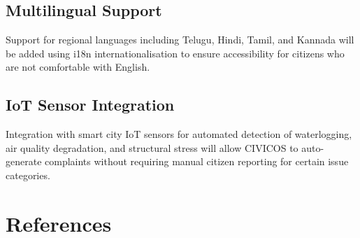 \documentclass[12pt,a4paper]{report}
\begin{document}
\section{Multilingual Support}
Support for regional languages including Telugu, Hindi, Tamil, and Kannada
will be added using i18n internationalisation to ensure accessibility for
citizens who are not comfortable with English.

\section{IoT Sensor Integration}
Integration with smart city IoT sensors for automated detection of
waterlogging, air quality degradation, and structural stress will allow
CIVICOS to auto-generate complaints without requiring manual citizen
reporting for certain issue categories.

\chapter{References}
\end{document}
